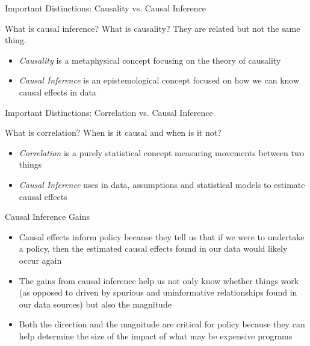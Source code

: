 \documentclass{beamer}
\begin{document}
\begin{frame}{Important Distinctions: Causality vs. Causal Inference}

What is causal inference?  What is causality?  They are related but not the same thing. 

\bigskip

\begin{itemize}
\item \emph{Causality} is a metaphysical concept focusing on the theory of causality
\item \emph{Causal Inference} is an epistemological concept focused on how we can know causal effects in data
\end{itemize}
\end{frame}


\begin{frame}{Important Distinctions: Correlation vs. Causal Inference}

What is correlation?  When is it causal and when is it not? 

\bigskip

\begin{itemize}
\item \emph{Correlation} is a purely statistical concept measuring movements between two things
\item \emph{Causal Inference} uses in data, assumptions and statistical models to estimate causal effects
\end{itemize}
\end{frame}

\begin{frame}{Causal Inference Gains}

\begin{itemize}

\item Causal effects inform policy because they tell us that if we were to undertake a policy, then the estimated causal effects found in our data would likely occur again
\item The gains from causal inference help us not only know whether things work (as opposed to driven by spurious and uninformative relationships found in our data sources) but also the magnitude
\item Both the direction and the magnitude are critical for policy because they can help determine the size of the impact of what may be expensive programs

\end{itemize}
\end{frame}
\end{document}
